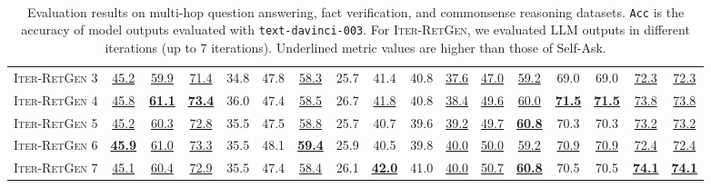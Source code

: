 \documentclass[11pt]{article}
\begin{document}
\begin{table}[t!]
{\begin{tabular}{ccccccccccccccccc}
I\textsc{ter}-R\textsc{et}G\textsc{en} 3  & \underline{45.2} & \underline{59.9} & \underline{71.4} & 34.8 & 47.8 & \underline{58.3} & 25.7 & 41.4 & 40.8 & \underline{37.6} & \underline{47.0} & \underline{59.2} & 69.0 & 69.0 & \underline{72.3} & \underline{72.3}\\
I\textsc{ter}-R\textsc{et}G\textsc{en} 4  & \underline{45.8} & \underline{\textbf{61.1}} & \underline{\textbf{73.4}} & 36.0 & 47.4 & \underline{58.5} & 26.7 & \underline{41.8} & 40.8 & \underline{38.4} & \underline{49.6} & \underline{60.0} & \underline{\textbf{71.5}} & \underline{\textbf{71.5}} & \underline{73.8} & \underline{73.8}\\
I\textsc{ter}-R\textsc{et}G\textsc{en} 5  & \underline{45.2} & \underline{60.3} & \underline{72.8} & 35.5 & 47.5 & \underline{58.8} & 25.7 & 40.7 & 39.6 & \underline{39.2} & \underline{49.7} & \underline{\textbf{60.8}} & 70.3 & 70.3 & \underline{73.2} & \underline{73.2}\\
I\textsc{ter}-R\textsc{et}G\textsc{en} 6  & \underline{\textbf{45.9}} & \underline{61.0} & \underline{73.3} & 35.5 & 48.1 & \underline{\textbf{59.4}} & 25.9 & 40.5 & 39.8 & \underline{40.0} & \underline{50.0} & \underline{59.2} & \underline{70.9} & \underline{70.9} & \underline{72.4} & \underline{72.4}\\
I\textsc{ter}-R\textsc{et}G\textsc{en} 7  & \underline{45.1} & \underline{60.4} & \underline{72.9} & 35.5 & 47.4 & \underline{58.4} & 26.1 & \underline{\textbf{42.0}} & 41.0 & \underline{40.0} & \underline{50.7} & \underline{\textbf{60.8}} & 70.5 & 70.5 & \underline{\textbf{74.1}} & \underline{\textbf{74.1}}\\
\bottomrule
\end{tabular}
}
    \caption{
    Evaluation results on multi-hop question answering, fact verification, and commonsense reasoning datasets.
    \texttt{Acc\textsuperscript{\dag}} is the accuracy of model outputs evaluated with \texttt{text-davinci-003}.
    For I\textsc{ter}-R\textsc{et}G\textsc{en}, we evaluated LLM outputs in different iterations (up to 7 iterations).
    Underlined metric values are higher than those of Self-Ask.
    }
    \label{tab:main_results}
\end{table}
\endgroup
\end{document}
